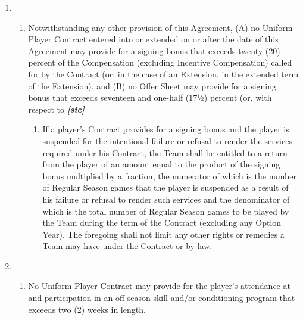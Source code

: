 \documentclass[
]{book}
\providecommand{\tightlist}{%
  \setlength{\itemsep}{0pt}\setlength{\parskip}{0pt}}
\begin{document}
\begin{enumerate}
\def\labelenumi{(\alph{enumi})}
\item
  \begin{enumerate}
  \def\labelenumii{(\roman{enumii})}
  \tightlist
  \item
    Notwithstanding any other provision of this Agreement, (A) no Uniform Player Contract entered into or extended on or after the date of this Agreement may provide for a signing bonus that exceeds twenty (20) percent of the Compensation (excluding Incentive Compensation) called for by the Contract (or, in the case of an Extension, in the extended term of the Extension), and (B) no Offer Sheet may provide for a signing bonus that exceeds seventeen and one-half (17½) percent (or, with respect to \textbf{\emph{{[}sic{]}}}

    \begin{enumerate}
    \def\labelenumiii{(\roman{enumiii})}
    \setcounter{enumiii}{1}
    \tightlist
    \item
      If a player's Contract provides for a signing bonus and the player is suspended for the intentional failure or refusal to render the services required under his Contract, the Team shall be entitled to a return from the player of an amount equal to the product of the signing bonus multiplied by a fraction, the numerator of which is the number of Regular Season games that the player is suspended as a result of his failure or refusal to render such services and the denominator of which is the total number of Regular Season games to be played by the Team during the term of the Contract (excluding any Option Year). The foregoing shall not limit any other rights or remedies a Team may have under the Contract or by law.
    \end{enumerate}
  \end{enumerate}
\item
  \begin{enumerate}
  \def\labelenumii{(\roman{enumii})}
  \tightlist
  \item
    No Uniform Player Contract may provide for the player's attendance at and participation in an off-season skill and/or conditioning program that exceeds two (2) weeks in length.


\end{enumerate}
\end{enumerate}
\end{document}
